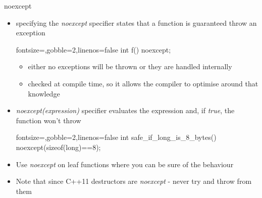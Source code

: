 \begin{frame}[fragile]
  \begin{block}{noexcept}
    \begin{itemize}
      \item specifying the \textit{noexcept} specifier states that a function is guaranteed throw an exception
      \begin{cppcode*}{fontsize=\scriptsize,gobble=2,linenos=false}
        int f() noexcept;
      \end{cppcode*}
      \begin{itemize}
        \item either no exceptions will be thrown or they are handled internally
        \item checked at compile time, so it allows the compiler to optimise around that knowledge
      \end{itemize}
      \item \textit{noexcept(expression)} specifier evaluates the expression and, if \textit{true}, the function won't throw
        \begin{cppcode*}{fontsize=\scriptsize,gobble=2,linenos=false}
          int safe_if_long_is_8_bytes() noexcept(sizeof(long)==8);
        \end{cppcode*}
      \item Use \textit{noexcept} on leaf functions where you can be sure of the behaviour
      \item Note that since C++11 destructors are \textit{noexcept} - never try and throw from them
    \end{itemize}
  \end{block}
\end{frame}
